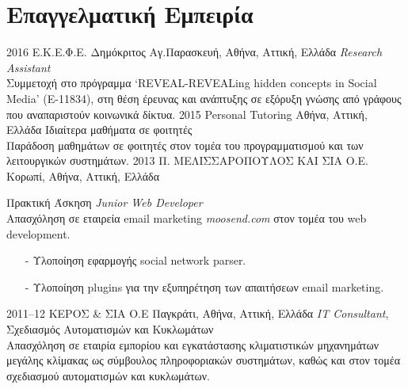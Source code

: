 \documentclass[print]{keros-cv} %
\begin{document}
\section{Επαγγελματική Εμπειρία}

\begin{entrylist}
\entry
{2016}
{Ε.Κ.Ε.Φ.Ε. Δημόκριτος}
{Αγ.Παρασκευή, Αθήνα, Αττική, Ελλάδα}
{\emph{Research Assistant}\\
Συμμετοχή στο πρόγραμμα `REVEAL-REVEALing hidden concepts in Social Media' (Ε-11834), στη θέση έρευνας και ανάπτυξης σε εξόρυξη γνώσης από γράφους που αναπαριστούν κοινωνικά δίκτυα.}
\entry
{2015}
{Personal Tutoring}
{Αθήνα, Αττική, Ελλάδα}
{ Ιδιαίτερα μαθήματα σε φοιτητές\\
Παράδοση μαθημάτων σε φοιτητές στον τομέα του προγραμματισμού και των λειτουργικών συστημάτων.} 
\entry
{2013}
{Π. ΜΕΛΙΣΣΑΡΟΠΟΥΛΟΣ ΚΑΙ ΣΙΑ Ο.Ε.}
{Κορωπί, Αθήνα, Αττική, Ελλάδα}
{Πρακτική Άσκηση \emph{Junior Web Developer} \\
Απασχόληση σε εταιρεία email marketing \emph{moosend.com} στον τομέα
του web development.
\begin{itemize}
\item[-] Υλοποίηση εφαρμογής social network parser. %
\item[-] Υλοποίηση plugins για την εξυπηρέτηση των απαιτήσεων email marketing. %
\end{itemize}}
\entry
{2011--12}
{ΚΕΡΟΣ \& ΣΙΑ Ο.Ε}
{Παγκράτι, Αθήνα, Αττική, Ελλάδα}
{\emph{IT Consultant}, Σχεδιασμός Αυτοματισμών και Κυκλωμάτων\\
Απασχόληση σε εταιρία εμπορίου και εγκατάστασης κλιματιστικών μηχανημάτων μεγάλης κλίμακας ως σύμβουλος πληροφοριακών συστημάτων, καθώς και στον τομέα σχεδιασμού αυτοματισμών και κυκλωμάτων.}
\end{entrylist}


\end{document}
